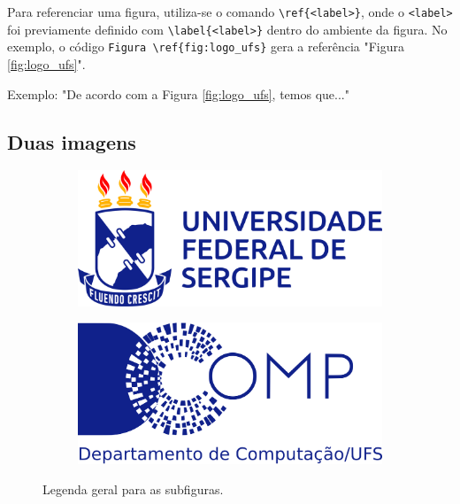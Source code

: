 Para referenciar uma figura, utiliza-se o comando \verb|\ref{<label>}|, onde o \texttt{<label>} foi previamente definido com \verb|\label{<label>}| dentro do ambiente da figura. No exemplo, o código \verb|Figura \ref{fig:logo_ufs}| gera a referência "Figura \ref{fig:logo_ufs}".

Exemplo: "De acordo com a Figura \ref{fig:logo_ufs}, temos que..."


\subsection{Duas imagens}

\begin{figure}[H]
    \centering
    
    \begin{subfigure}{0.3\textwidth}
        \centering
        \includegraphics[width=\linewidth]{Imagens/ufs_horizontal_positiva.png}
        \caption{}
        \label{fig:subimagem1}
    \end{subfigure}
    \hspace{1cm} %
    \begin{subfigure}{0.3\textwidth}
        \centering
        \includegraphics[width=\linewidth]{Imagens/DCOMP LOGO-AZUL NOVO-01.png}
        \caption{}
        \label{fig:subimagem2}
    \end{subfigure}
    
    \caption{Legenda geral para as subfiguras.}
    \label{fig:subfiguras_lado_a_lado}
\end{figure}

